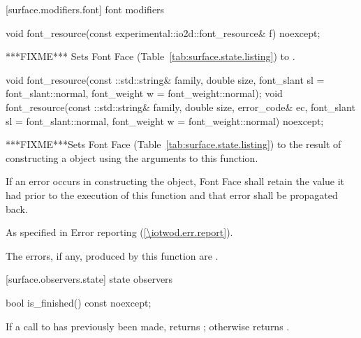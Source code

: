  [surface.modifiers.font] { font modifiers}

\begin{itemdecl}
void font_resource(const experimental::io2d::font_resource& f) noexcept;
\end{itemdecl}
\begin{itemdescr}
\pnum
\effects
***FIXME*** Sets Font Face (Table~\ref{tab:surface.state.listing}) to .
\end{itemdescr}

\begin{itemdecl}
void font_resource(const ::std::string& family, double size,
  font_slant sl = font_slant::normal, font_weight w = font_weight::normal);
void font_resource(const ::std::string& family, double size, error_code& ec,
  font_slant sl = font_slant::normal,
  font_weight w = font_weight::normal) noexcept;
\end{itemdecl}
\begin{itemdescr}
\pnum
\effects
***FIXME***Sets Font Face (Table~\ref{tab:surface.state.listing}) to the result of constructing a  object using the arguments to this function.

\pnum
If an error occurs in constructing the  object, Font Face shall retain the value it had prior to the execution of this function and that error shall be propagated back.

\pnum
\throws
As specified in Error reporting (\ref{\iotwod.err.report}).

\pnum
\errors
The errors, if any, produced by this function are .
\end{itemdescr}

 [surface.observers.state] { state observers}

\begin{itemdecl}
bool is_finished() const noexcept;
\end{itemdecl}
\begin{itemdescr}
\pnum
\returns
If a call to  has previously been made, returns ; otherwise returns .
\end{itemdescr}


